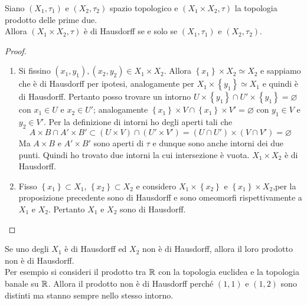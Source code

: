 \begin{theorem}
	Siano $(X_1, \tau_1)$ e $(X_2, \tau_2)$ spazio topologico e $(X_1 \times X_2, \tau)$ la topologia prodotto delle prime due. \\Allora $(X_1 \times X_2, \tau)$ è di Hausdorff se e solo se $(X_1, \tau_1)$ e $(X_2, \tau_2)$.
\end{theorem} 
\begin{proof} \
	\begin{enumerate}
		\item Si fissino $(x_1, y_1), (x_2, y_2) \in X_1 \times X_2$. Allora $\left\{x_1\right\} \times X_2 \simeq X_2$ e sappiamo che è di Hausdorff per ipotesi, analogamente per $X_1 \times \left\{y_1\right\} \simeq X_1$ e quindi è di Hausdorff. Pertanto posso trovare un intorno $U \times \left\{y_1\right\} \cap U' \times \left\{y_1\right\} = \varnothing$ con $x_1 \in U$ e $x_2 \in U'$; analogamente $\left\{x_1\right\} \times V \cap \left\{x_1\right\} \times V' = \varnothing$ con $y_1 \in V$ e $y_2 \in V'$. Per la definizione di intorni ho degli aperti tali che 
		\begin{equation*}
		A \times B \cap A' \times B' \subset (U \times V) \cap (U' \times V') = (U \cap U') \times (V \cap V') = \varnothing
		\end{equation*}
		Ma $A \times B$ e $A' \times B'$ sono aperti di $\tau$ e dunque sono anche intorni dei due punti. Quindi ho trovato due intorni la cui intersezione è vuota. $X_1 \times X_2$ è di Hausdorff.
		\item Fisso $\left\{x_1\right\} \subset X_1$, $\left\{x_2\right\} \subset X_2$ e considero $X_1 \times \left\{x_2\right\}$ e $\left\{x_1\right\} \times X_2$,per la proposizione precedente sono di Hausdorff e sono omeomorfi rispettivamente a $X_1$ e $X_2$. Pertanto $X_1$ e $X_2$ sono di Hausdorff.
	\end{enumerate}
\end{proof}

\begin{remark}
Se uno degli $X_1$ è di Hausdorff ed $X_2$ non è di Hausdorff, allora il loro prodotto non è di Hausdorff. \\ Per esempio si consideri il prodotto tra $\mathbb{R}$ con la topologia euclidea e la topologia banale su $\mathbb{R}$. Allora il prodotto non è di Hausdorff perché $(1,1)$ e $(1,2)$ sono distinti ma stanno sempre nello stesso intorno. 
	
\end{remark} 


